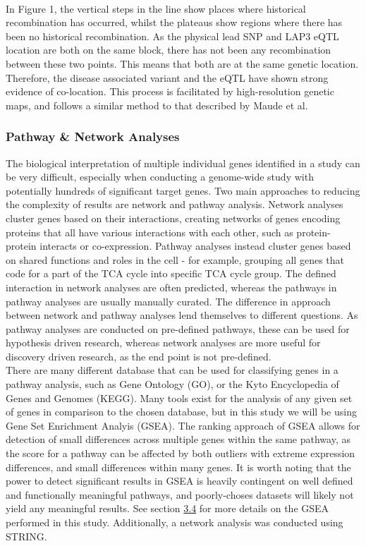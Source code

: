 \documentclass{article}
\begin{document}
\\In Figure 1, the vertical steps in the line show places where historical recombination has occurred, whilst the plateaus show regions where there has been no historical recombination. As the physical lead SNP and LAP3 eQTL location are both on the same block, there has not been any recombination between these two points. This means that both are at the same genetic location. Therefore, the disease associated variant and the eQTL have shown strong evidence of co-location.
This process is facilitated by high-resolution genetic maps\cite{Maniatis2004PositionalDisequilibrium.}, and follows a similar method to that described by Maude et al.\cite{Maude2021NewDiabetes.}
\newpage
\subsubsection{Pathway \& Network Analyses}
\label{subsubec:pathwaysandnetworks}
The biological interpretation of multiple individual genes identified in a study can be very difficult, especially when conducting a genome-wide study with potentially hundreds of significant target genes. Two main approaches to reducing the complexity of results are network and pathway analysis. Network analyses cluster genes based on their interactions, creating networks of genes encoding proteins that all have various interactions with each other\cite{Maayan2011IntroductionBiology}, such as protein-protein interacts or co-expression. Pathway analyses instead cluster genes based on shared functions and roles in the cell\cite{Garcia-Campos2015PathwayArt} - for example, grouping all genes that code for a part of the TCA cycle into specific TCA cycle group. The defined interaction in network analyses are often predicted, whereas the pathways in pathway analyses are usually manually curated. The difference in approach between network and pathway analyses lend themselves to different questions. As pathway analyses are conducted on pre-defined pathways, these can be used for hypothesis driven research, whereas network analyses are more useful for discovery driven research, as the end point is not pre-defined.
\\There are many different database that can be used for classifying genes in a pathway analysis, such as Gene Ontology (GO)\cite{Ashburner2000GeneBiology}, or the Kyto Encyclopedia of Genes and Genomes (KEGG)\cite{Kanehisa2016KEGGAnnotation}. Many tools exist for the analysis of any given set of genes in comparison to the chosen database, but in this study we will be using Gene Set Enrichment Analyis (GSEA)\cite{Subramanian2005GeneProfiles}. The ranking approach of GSEA allows for detection of small differences across multiple genes within the same pathway, as the score for a pathway can be affected by both outliers with extreme expression differences, and small differences within many genes. It is worth noting that the power to detect significant results in GSEA is heavily contingent on well defined and functionally meaningful pathways, and poorly-choses datasets will likely not yield any meaningful results. See section \hyperref[subsec:pathways]{3.4} for more details on the GSEA performed in this study. Additionally, a network analysis was conducted using STRING\cite{Neumeyer2020StrengtheningLoci}.
\end{document}
